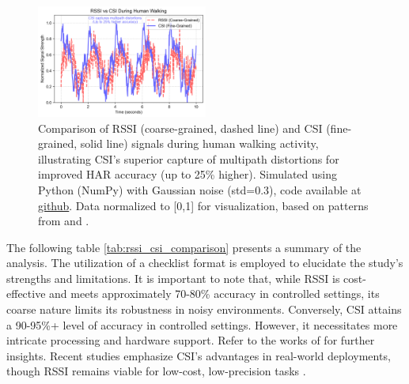 \documentclass[Afour,sageh,times]{sagej}
\begin{document}
\begin{figure}[htbp]
\footnotesize
\centering
\includegraphics[width=0.5\textwidth]{4.rssi_csi_figure.png}
\caption{Comparison of RSSI (coarse-grained, dashed line) and CSI (fine-grained, solid line) signals during human walking activity, illustrating CSI's superior capture of multipath distortions for improved HAR accuracy (up to 25\% higher). Simulated using Python (NumPy) with Gaussian noise (std=0.3), code available at  \href{https://github.com/zhihaozhao/DFHAR/blob/master/Fig4RSSIvsCSI.ipynb}{github}. Data normalized to [0,1] for visualization, based on patterns from \citep{guo2019robust} and \citep{venkatnarayan2018multiperson}.}
\label{fig:optimized_rssi_csi_comparison}
\end{figure}

The following table \ref{tab:rssi_csi_comparison} presents a summary of the analysis. The utilization of a checklist format is employed to elucidate the study's strengths and limitations. It is important to note that, while RSSI is cost-effective and meets approximately 70-80\% accuracy in controlled settings, its coarse nature limits its robustness in noisy environments. Conversely, CSI attains a 90-95\%+ level of accuracy in controlled settings. However, it necessitates more intricate processing and hardware support.
Refer to the works of \citep{guo2019robust, islam2022stc} for further insights.
Recent studies emphasize CSI's advantages in real-world deployments, though RSSI remains viable for low-cost, low-precision tasks \citep{moshiri2020using, zhou2022target}.
\end{document}

